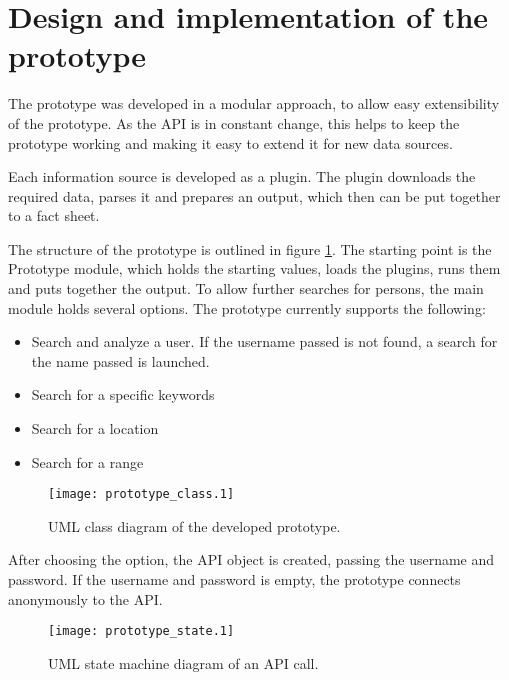 \section{Design and implementation of the prototype}

The prototype was developed in a modular approach, to allow easy extensibility
of the prototype. As the \Twitter{} API is in constant change, this helps to
keep the prototype working and making it easy to extend it for new data
sources.

Each information source is developed as a plugin. The plugin downloads the
required data, parses it and prepares an output, which then can be put together
to a fact sheet.

The structure of the prototype is outlined in figure \ref{fig:prototype_class}.
The starting point is the Prototype module, which holds the starting values,
loads the plugins, runs them and puts together the output. To allow further
searches for persons, the main module holds several options. The prototype
currently supports the following:

\begin{itemize}
  \item Search and analyze a user. If the username passed is not found, a
  search for the name passed is launched.
  \item Search for a specific keywords
  \item Search for a location
  \item Search for a range
\end{itemize}

\begin{figure}[ht]
  \begin{center}
    \texttt{[image: prototype\_class.1]}
    \label{fig:prototype_class}
    \caption{UML class diagram of the developed prototype.}
  \end{center}
\end{figure}

After choosing the option, the API object is created, passing the username and
password. If the username and password is empty, the prototype connects
anonymously to the \Twitter{} API.

\begin{figure}[ht]
  \begin{center}
    \texttt{[image: prototype\_state.1]}
    \label{fig:prototype_state}
    \caption{UML state machine diagram of an \Twitter{} API call.}
  \end{center}
\end{figure}

